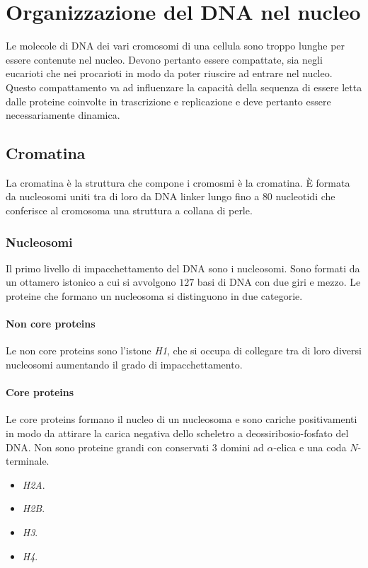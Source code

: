 \section{Organizzazione del DNA nel nucleo}
Le molecole di DNA dei vari cromosomi di una cellula sono troppo lunghe per essere contenute nel nucleo.
Devono pertanto essere compattate, sia negli eucarioti che nei procarioti in modo da poter riuscire ad entrare nel nucleo.
Questo compattamento va ad influenzare la capacit\`a della sequenza di essere letta dalle proteine coinvolte in trascrizione e replicazione e deve pertanto essere necessariamente dinamica.

	\subsection{Cromatina}
	La cromatina \`e la struttura che compone i cromosmi \`e la cromatina.
	\`E formata da nucleosomi uniti tra di loro da DNA linker lungo fino a $80$ nucleotidi che conferisce al cromosoma una struttura a collana di perle.
	
		\subsubsection{Nucleosomi}
		Il primo livello di impacchettamento del DNA sono i nucleosomi.
		Sono formati da un ottamero istonico a cui si avvolgono $127$ basi di DNA con due giri e mezzo.
		Le proteine che formano un nucleosoma si distinguono in due categorie.
		
			\paragraph{Non core proteins}
			Le non core proteins sono l'istone \emph{H1}, che si occupa di collegare tra di loro diversi nucleosomi aumentando il grado di impacchettamento.

			\paragraph{Core proteins}
			Le core proteins formano il nucleo di un nucleosoma e sono cariche positivamenti in modo da attirare la carica negativa dello scheletro a deossiribosio-fosfato del DNA.
			Non sono proteine grandi con conservati $3$ domini ad $\alpha$-elica e una coda $N$-terminale.
			\begin{multicols}{4}
				\begin{itemize}
					\item \emph{H2A}.
					\item \emph{H2B}.
					\item \emph{H3}.
					\item \emph{H4}.
				\end{itemize}
			\end{multicols}
			


